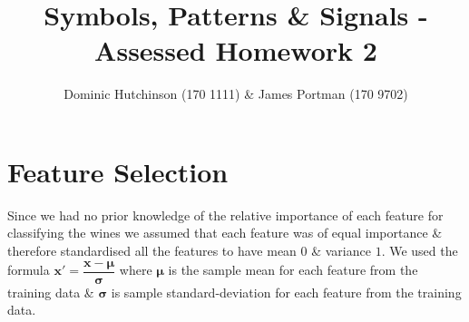\documentclass[11pt,a4paper]{article}
\begin{document}
\pagestyle{fancy}
\allowdisplaybreaks

\title{Symbols, Patterns \& Signals - Assessed Homework 2}
\author{Dominic Hutchinson (170 1111) \& James Portman (170 9702)}
\date{}
\maketitle


\section{Feature Selection}
Since we had no prior knowledge of the relative importance of each feature for classifying the wines we assumed that each feature was of equal importance \& therefore standardised all the features to have mean $0$ \& variance $1$. We used the formula $\pmb{x}'=\dfrac{\pmb{x}-\pmb{\mu}}{\pmb{\sigma}}$ where $\pmb{\mu}$ is the sample mean for each feature from the training data \& $\pmb{\sigma}$ is sample standard-deviation for each feature from the training data.
\end{document}
